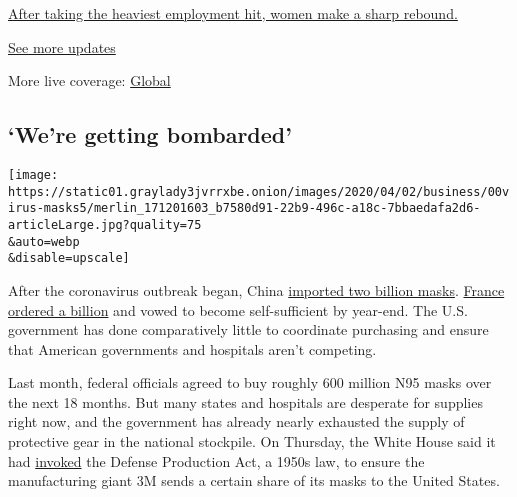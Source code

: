 \href{https://www.nytimes3xbfgragh.onion/live/2020/09/04/business/stock-market-today-coronavirus?action=click\&pgtype=Article\&state=default\&region=MAIN_CONTENT_1\&context=storylines_live_updates\#after-taking-the-heaviest-employment-hit-women-make-a-sharp-rebound}{After
taking the heaviest employment hit, women make a sharp rebound.}

\href{https://www.nytimes3xbfgragh.onion/live/2020/09/04/business/stock-market-today-coronavirus?action=click\&pgtype=Article\&state=default\&region=MAIN_CONTENT_1\&context=storylines_live_updates}{See
more updates}

More live coverage:
\href{https://www.nytimes3xbfgragh.onion/2020/09/04/world/covid-19-coronavirus.html?action=click\&pgtype=Article\&state=default\&region=MAIN_CONTENT_1\&context=storylines_live_updates}{Global}

\hypertarget{were-getting-bombarded}{%
\subsection{`We're getting bombarded'}\label{were-getting-bombarded}}

\texttt{[image: https://static01.graylady3jvrrxbe.onion/images/2020/04/02/business/00virus-masks5/merlin\_171201603\_b7580d91-22b9-496c-a18c-7bbaedafa2d6-articleLarge.jpg?quality=75\\\&auto=webp\\\&disable=upscale]}

After the coronavirus outbreak began, China
\href{https://www.nytimes3xbfgragh.onion/2020/04/01/business/coronavirus-china-masks.html}{imported
two billion masks}.
\href{https://www.nytimes3xbfgragh.onion/reuters/2020/03/31/world/europe/31reuters-health-coronavirus-france-masks.html}{France
ordered a billion} and vowed to become self-sufficient by year-end. The
U.S. government has done comparatively little to coordinate purchasing
and ensure that American governments and hospitals aren't competing.

Last month, federal officials agreed to buy roughly 600 million N95
masks over the next 18 months. But many states and hospitals are
desperate for supplies right now, and the government has already nearly
exhausted the supply of protective gear in the national stockpile. On
Thursday, the White House said it had
\href{https://www.nytimes3xbfgragh.onion/2020/04/02/world/coronavirus-live-news-updates.html\#link-711303f6}{invoked}
the Defense Production Act, a 1950s law, to ensure the manufacturing
giant 3M sends a certain share of its masks to the United States.

